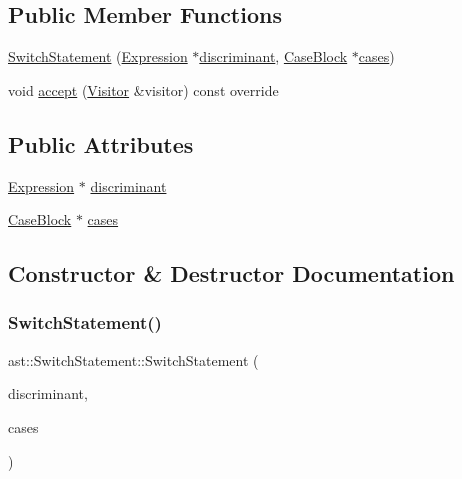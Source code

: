 \subsection*{Public Member Functions}
\begin{DoxyCompactItemize}
\item 
\hyperlink{structast_1_1_switch_statement_a383a235778035139122845f4caa53155}{Switch\+Statement} (\hyperlink{structast_1_1_expression}{Expression} $\ast$\hyperlink{structast_1_1_switch_statement_a145d4ed86b864eda3fd4322edb0a43e7}{discriminant}, \hyperlink{structast_1_1_case_block}{Case\+Block} $\ast$\hyperlink{structast_1_1_switch_statement_ab03ba54ce22b34b83dcd3478ba0a6eb4}{cases})
\item 
void \hyperlink{structast_1_1_switch_statement_a1f570a3ec718c95348cedbddcf8e96a1}{accept} (\hyperlink{structast_1_1_visitor}{Visitor} \&visitor) const override
\end{DoxyCompactItemize}
\subsection*{Public Attributes}
\begin{DoxyCompactItemize}
\item 
\hyperlink{structast_1_1_expression}{Expression} $\ast$ \hyperlink{structast_1_1_switch_statement_a145d4ed86b864eda3fd4322edb0a43e7}{discriminant}
\item 
\hyperlink{structast_1_1_case_block}{Case\+Block} $\ast$ \hyperlink{structast_1_1_switch_statement_ab03ba54ce22b34b83dcd3478ba0a6eb4}{cases}
\end{DoxyCompactItemize}


\subsection{Constructor \& Destructor Documentation}
\mbox{\label{structast_1_1_switch_statement_a383a235778035139122845f4caa53155}} 
\subsubsection{\texorpdfstring{Switch\+Statement()}{SwitchStatement()}}
{\footnotesize\ttfamily ast\+::\+Switch\+Statement\+::\+Switch\+Statement (\begin{DoxyParamCaption}\item[{\hyperlink{structast_1_1_expression}{Expression} $\ast$}]{discriminant,  }\item[{\hyperlink{structast_1_1_case_block}{Case\+Block} $\ast$}]{cases }\end{DoxyParamCaption})\hspace{0.3cm}{\ttfamily [inline]}}



